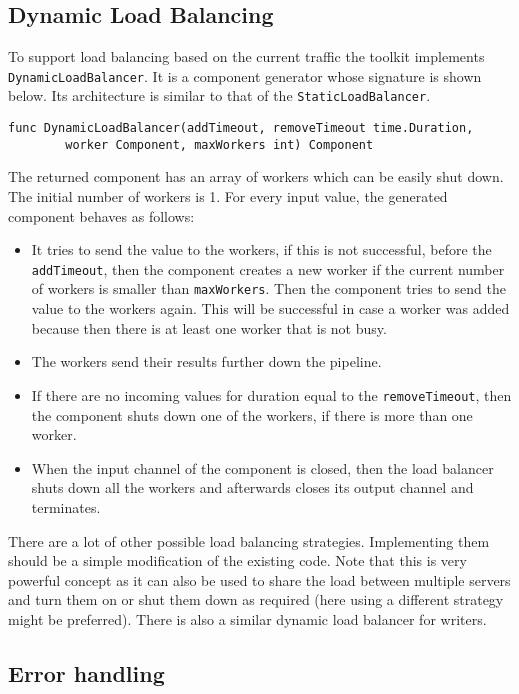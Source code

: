 \subsection{Dynamic Load Balancing}
To support load balancing based on the current traffic the toolkit implements
\texttt{DynamicLoadBalancer}. It is a component generator whose signature is
shown below. Its architecture is similar
to that of the \texttt{StaticLoadBalancer}.
\begin{lstlisting}
func DynamicLoadBalancer(addTimeout, removeTimeout time.Duration, 
        worker Component, maxWorkers int) Component
\end{lstlisting}
The returned component has an array of workers which can be easily shut down.
The initial number of workers is 1. 
For every input value, the generated component behaves as follows:
\begin{itemize}
	\item It tries to send the value to the workers, if this is not successful, 
		    before the \texttt{addTimeout}, then the component creates a new worker
        if the current number of workers is smaller than \texttt{maxWorkers}.
        Then the component tries to send the value to the workers again. This will 
        be successful in case a worker was added because then there is at least one 
        worker that is not busy.

	\item The workers send their results further down the pipeline.

	\item If there are no incoming values for duration equal to the 
        \texttt{removeTimeout}, then the component shuts down one 
        of the workers, if there is more than one worker.

	\item When the input channel of the component is closed, then the load balancer 
        shuts down all the workers and afterwards closes its output channel and
        terminates.
\end{itemize}
There are a lot of other possible load balancing strategies. 
Implementing them should be a simple modification of the existing code.
Note that this is very powerful concept as it can also be used to share
the load between multiple servers and turn them on or shut them down as
required (here using a different strategy might be preferred). There is
also a similar dynamic load balancer for writers.

\subsection{Error handling}

